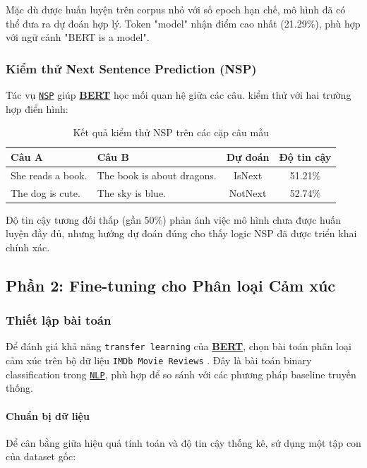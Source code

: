 Mặc dù được huấn luyện trên corpus nhỏ với số epoch hạn chế, mô hình đã có thể đưa ra dự đoán hợp lý. Token "model" nhận điểm cao nhất (21.29\%), phù hợp với ngữ cảnh "BERT is a model".

\subsubsection{Kiểm thử Next Sentence Prediction (NSP)}

Tác vụ \hyperref[acro:nsp]{\texttt{NSP}} giúp \hyperref[acro:bert]{\textbf{BERT}} học mối quan hệ giữa các câu. kiểm thử với hai trường hợp điển hình:

\begin{table}[H]
\centering
\caption{Kết quả kiểm thử NSP trên các cặp câu mẫu}
\label{tab:nsp_test_results}
\begin{tabular}{p{3cm}p{3cm}cc}
\toprule
\textbf{Câu A} & \textbf{Câu B} & \textbf{Dự đoán} & \textbf{Độ tin cậy} \\
\midrule
She reads a book. & The book is about dragons. & IsNext & 51.21\% \\
The dog is cute. & The sky is blue. & NotNext & 52.74\% \\
\bottomrule
\end{tabular}
\end{table}

Độ tin cậy tương đối thấp (gần 50\%) phản ánh việc mô hình chưa được huấn luyện đầy đủ, nhưng hướng dự đoán đúng cho thấy logic NSP đã được triển khai chính xác.

\subsection{Phần 2: Fine-tuning cho Phân loại Cảm xúc}
\label{ssec:fine_tuning_sentiment}

\subsubsection{Thiết lập bài toán}

Để đánh giá khả năng \texttt{transfer learning} của \hyperref[acro:bert]{\textbf{BERT}}, chọn bài toán phân loại cảm xúc trên bộ dữ liệu \texttt{IMDb Movie Reviews} \cite{maas2011learning}. Đây là bài toán binary classification trong \hyperref[acro:nlp]{\texttt{NLP}}, phù hợp để so sánh với các phương pháp baseline truyền thống.

\paragraph{Chuẩn bị dữ liệu}
Để cân bằng giữa hiệu quả tính toán và độ tin cậy thống kê, sử dụng một tập con của dataset gốc:

